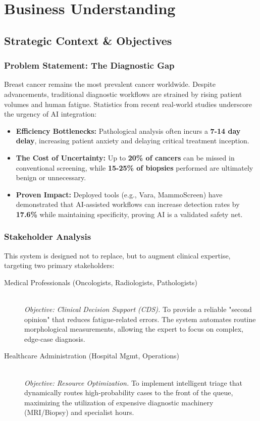 \chapter{Business Understanding}


\section{Strategic Context \& Objectives}
\subsection{Problem Statement: The Diagnostic Gap}
Breast cancer remains the most prevalent cancer worldwide. Despite advancements, traditional diagnostic workflows are strained by rising patient volumes and human fatigue. Statistics from recent real-world studies underscore the urgency of AI integration:

\begin{itemize}
    \item \textbf{Efficiency Bottlenecks:} Pathological analysis often incurs a \textbf{7-14 day delay}, increasing patient anxiety and delaying critical treatment inception.
    \item \textbf{The Cost of Uncertainty:} Up to \textbf{20\% of cancers} can be missed in conventional screening, while \textbf{15-25\% of biopsies} performed are ultimately benign or unnecessary.
    \item \textbf{Proven Impact:} Deployed tools (e.g., Vara, MammoScreen) have demonstrated that AI-assisted workflows can increase detection rates by \textbf{17.6\%} while maintaining specificity, proving AI is a validated safety net.
\end{itemize}

\subsection{Stakeholder Analysis}
This system is designed not to replace, but to augment clinical expertise, targeting two primary stakeholders:

\begin{description}
    \item[Medical Professionals (Oncologists, Radiologists, Pathologists)] \hfill \\
    \textit{Objective: Clinical Decision Support (CDS).} To provide a reliable "second opinion" that reduces fatigue-related errors. The system automates routine morphological measurements, allowing the expert to focus on complex, edge-case diagnosis.
    
    \item[Healthcare Administration (Hospital Mgmt, Operations)] \hfill \\
    \textit{Objective: Resource Optimization.} To implement intelligent triage that dynamically routes high-probability cases to the front of the queue, maximizing the utilization of expensive diagnostic machinery (MRI/Biopsy) and specialist hours.
\end{description}

